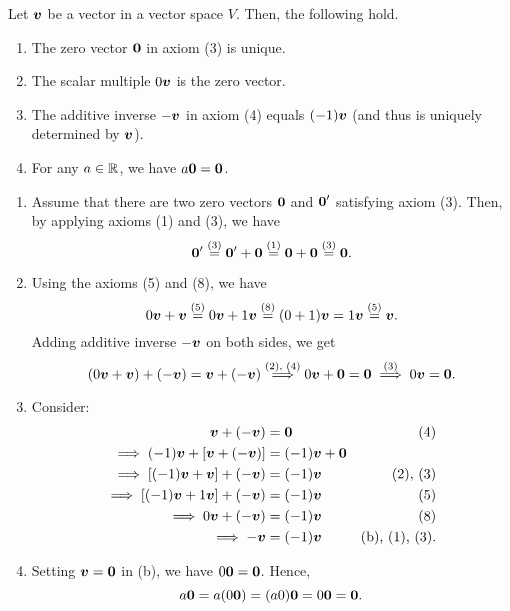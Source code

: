 \begin{enumerate}
\begin{proposition}
\label{prp:vector-space-prop}
Let \(\vb*{v}\) be a vector in a vector space \(V\). Then, the following hold.
\begin{enumerate}
\item The zero vector \(\vb*{0}\) in axiom (3) is unique.
\item The scalar multiple \(0\vb*{v}\) is the zero vector.
\item The additive inverse \(-\vb*{v}\) in axiom (4) equals \((-1)\vb*{v}\)
(and thus is uniquely determined by \(\vb*{v}\)).
\item For any \(a\in\mathbb{R}\), we have \(a\vb*{0}=\vb*{0}\).
\end{enumerate}
\end{proposition}
\begin{pf}
\begin{enumerate}
\item Assume that there are two zero vectors \(\vb*{0}\) and \(\vb*{0}'\)
satisfying axiom (3). Then, by applying axioms (1) and (3), we have
\[
\vb*{0}'\overset{\text{(3)}}{=}\vb*{0}'+\vb*{0}\overset{\text{(1)}}{=}
\vb*{0}+\vb*{0}\overset{\text{(3)}}{=}\vb*{0}.
\]
\item Using the axioms (5) and (8), we have
\[
0\vb*{v}+\vb*{v}\overset{\text{(5)}}{=}0\vb*{v}+1\vb*{v}
\overset{\text{(8)}}{=}(0+1)\vb*{v}
=1\vb*{v}
\overset{\text{(5)}}{=}\vb*{v}.
\]
Adding additive inverse \(-\vb*{v}\) on both sides, we get
\[
(0\vb*{v}+\vb*{v})+(-\vb*{v})=\vb*{v}+(-\vb*{v})
\overset{\text{(2), (4)}}{\implies}
0\vb*{v}+\vb*{0}=\vb*{0}
\overset{\text{(3)}}{\implies}
0\vb*{v}=\vb*{0}.
\]
\item Consider:
\begin{align*}
\vb*{v}+(-\vb*{v})&=\vb*{0}&\text{(4)}\\
\implies(-1)\vb*{v}+[\vb*{v}+(-\vb*{v})]&=(-1)\vb*{v}+\vb*{0}\\
\implies[(-1)\vb*{v}+\vb*{v}]+(-\vb*{v})&=(-1)\vb*{v}&\text{(2), (3)}\\
\implies[(-1)\vb*{v}+1\vb*{v}]+(-\vb*{v})&=(-1)\vb*{v}&\text{(5)}\\
\implies 0\vb*{v}+(-\vb*{v})&=(-1)\vb*{v}&\text{(8)}\\
\implies -\vb*{v}&=(-1)\vb*{v}&\text{(b), (1), (3)}.
\end{align*}
\item Setting \(\vb*{v}=\vb*{0}\) in (b), we have \(0\vb*{0}=\vb*{0}\).
Hence,
\[
a\vb*{0}=a(0\vb*{0})=(a0)\vb*{0}=0\vb*{0}=\vb*{0}.
\]
\end{enumerate}
\end{pf}
\end{enumerate}
